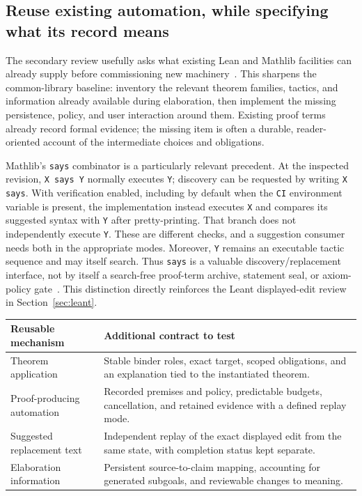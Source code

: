 \documentclass[11pt,letterpaper]{article}
\newcommand{\code}[1]{\nolinkurl{#1}}
\begin{document}
\subsection{Reuse existing automation, while specifying what its record means}
The secondary review usefully asks what existing Lean and Mathlib facilities can
already supply before commissioning new machinery~\cite[\S7.2]{secondary}. This
sharpens the common-library baseline: inventory the relevant theorem families,
tactics, and information already available during elaboration, then implement
the missing persistence, policy, and user interaction around them. Existing proof
terms already record formal evidence; the missing item is often a durable,
reader-oriented account of the intermediate choices and obligations.

Mathlib's \code{says} combinator is a particularly relevant precedent. At the
inspected revision, \texttt{X says Y} normally executes \code{Y}; discovery can be
requested by writing \texttt{X says}. With verification enabled, including by
default when the \code{CI} environment variable is present, the implementation
instead executes \code{X} and compares its suggested syntax with \code{Y} after
pretty-printing. That branch does not independently execute \code{Y}. These are
different checks, and a suggestion consumer needs both in the appropriate modes.
Moreover, \code{Y} remains an executable tactic sequence and may itself search.
Thus \code{says} is a valuable discovery/replacement interface, not by itself a
search-free proof-term archive, statement seal, or axiom-policy gate~\cite{mathlib-says}.
This distinction directly reinforces the Leant displayed-edit review in
Section~\ref{sec:leant}.

\begin{tabularx}{\textwidth}{@{}P{.29\textwidth}Y@{}}
\toprule
Reusable mechanism & Additional contract to test \\
\midrule
Theorem application & Stable binder roles, exact target, scoped obligations,
  and an explanation tied to the instantiated theorem.\\
Proof-producing automation & Recorded premises and policy, predictable budgets,
  cancellation, and retained evidence with a defined replay mode.\\
Suggested replacement text & Independent replay of the exact displayed edit
  from the same state, with completion status kept separate.\\
Elaboration information & Persistent source-to-claim mapping, accounting for
  generated subgoals, and reviewable changes to meaning.\\
\bottomrule
\end{tabularx}
\end{document}
